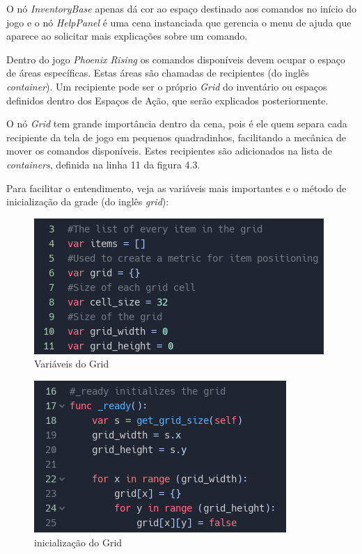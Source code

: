 O nó \textit{InventoryBase} apenas dá cor ao espaço destinado aos comandos no
início do jogo e o nó \textit{HelpPanel} é uma cena instanciada que gerencia o
menu de ajuda que aparece ao solicitar mais explicações sobre um comando.

Dentro do jogo \textit{Phoenix Rising} os comandos disponíveis devem ocupar o
espaço de áreas específicas. Estas áreas são chamadas de recipientes (do 
inglês \textit{container}). Um recipiente pode ser o próprio \textit{Grid} do 
inventário ou espaços definidos dentro dos Espaços de Ação, que serão explicados
posteriormente.

O nó \textit{Grid} tem grande importância dentro da cena, pois é ele quem separa
cada recipiente da tela de jogo em pequenos quadradinhos, facilitando a mecânica
de mover os comandos disponíveis. Estes recipientes são adicionados na lista de 
\textit{containers}, definida na linha 11 da figura 4.3.

Para facilitar o entendimento, veja as variáveis mais importantes e o método de 
inicialização da grade (do inglês \textit{grid}):

\begin{minipage}[c]{0.5\textwidth}
    \begin{figure}[H]
        \includegraphics[scale=0.5]{../figuras/grid_variables.png}
        \caption{Variáveis do Grid}
    \end{figure}
\end{minipage}%
\begin{minipage}[c]{0.6\textwidth}
    \begin{figure}[H]
        \includegraphics[scale=0.6]{../figuras/grid_ini.png}
        \caption{inicialização do Grid}
    \end{figure}
\end{minipage}

